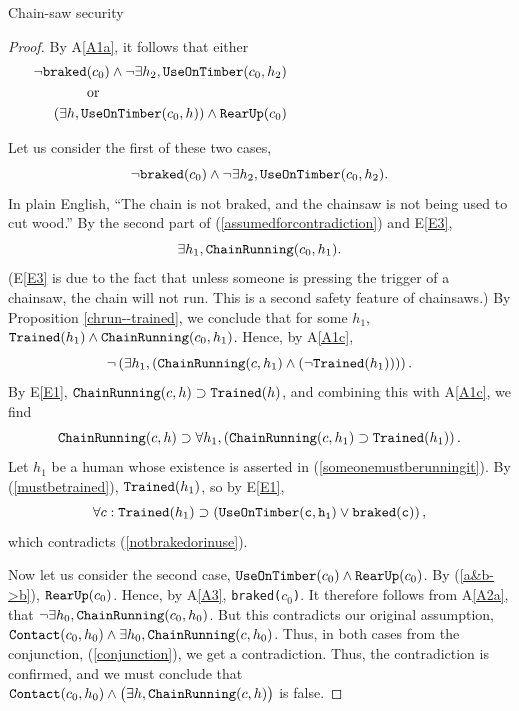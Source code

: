 \begin{example}{Chain-saw security}
\begin{proof}
By A\ref{A1a}, it follows that either 
\begin{eqnarray}\label{conjunction} \nonumber
&&\neg{\tt braked}(c_0) \wedge \neg \exists h_2,{\tt UseOnTimber(}c_0,h_2{\tt )}\\
\noalign{~~~~~~~~~~or~}
		&&\left(\exists h,{\tt UseOnTimber(}c_0, h{\tt )}\right) \wedge {\tt RearUp(}c_0{)}
\end{eqnarray}

Let us consider the first of these two cases, 
\begin{equation}\label{notbrakedorinuse}
		\neg{\tt braked}(c_0) \wedge \neg\exists h_2,{\tt UseOnTimber(}c_0,h_2{\tt )}.
\end{equation}
In plain English, ``The chain is not braked, and the chainsaw is not being used to cut wood.''
By the second part of (\ref{assumedforcontradiction}) and E\ref{E3},
\begin{equation}\label{someonemustberunningit}
	\exists h_1, {\tt ChainRunning(}c_0,h_1{\tt )}.
\end{equation}
(E\ref{E3} is due to the fact that unless someone is pressing
the trigger of a chainsaw, the chain will not run. This is a second safety feature of chainsaws.)
By Proposition \ref{chrun--trained}, we conclude that for some $h_1$,
${\tt Trained(}h_1{\tt )}\wedge {\tt ChainRunning(}c_0,h_1{\tt )}$.
Hence, by A\ref{A1c}, 
$$
\neg \left( \exists h_1,\left({\tt ChainRunning(}c,h_1{\tt )}
\wedge \left(\neg{\tt Trained(}h_1{\tt )}\right) \right)\right).
$$
By E\ref{E1}, ${\tt ChainRunning}(c,h) \supset {\tt Trained}(h)$, and combining this
with A\ref{A1c}, we find 
\begin{equation}\label{mustbetrained}
{\tt ChainRunning}(c,h) \supset \forall h_1, \left( {\tt ChainRunning}(c,h_1) \supset {\tt Trained}(h_1)\right).
\end{equation}
Let $h_1$ be a human whose existence is asserted in (\ref{someonemustberunningit}). By (\ref{mustbetrained}), 
${\tt Trained}(h_1)$, so by E\ref{E1}, 
$$
\forall c: {\tt Trained}(h_1) \supset \left( {\tt UseOnTimber(c,h_1)} \vee {\tt braked(c)} \right),
$$
which contradicts (\ref{notbrakedorinuse}).

Now let us consider the second case, ${\tt UseOnTimber(}c_0{\tt )} \wedge {\tt RearUp(}c_0{)}$.
By (\ref{a&b->b}), ${\tt RearUp(}c_0{)}$. Hence, by A\ref{A3}, {\tt braked($c_0$)}. 
It therefore follows from A\ref{A2a}, that $\neg\exists h_0, {\tt ChainRunning(}c_0,h_0{\tt )}$.
But this contradicts our original assumption, ${\tt Contact(}c_0,h_0{\tt )} 
\wedge \exists h_0, {\tt ChainRunning(}c,h_0{\tt )}$. 
Thus, in both cases from the conjunction, (\ref{conjunction}),
we get a contradiction. Thus, the contradiction is confirmed, and we must conclude
that ${\tt Contact(}c_0,h_0{\tt )} \wedge \big(\exists h,{\tt ChainRunning(}c,h{\tt )}\big)$ is false.
\end{proof}

\end{example}


